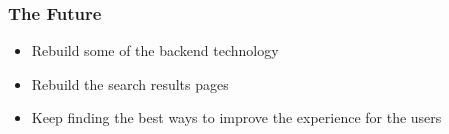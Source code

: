 \documentclass{beamer}
\begin{document}
\begin{frame}
  \frametitle{The Future}
  \begin{itemize}
    \pause \item Rebuild some of the backend technology
    \pause \item Rebuild the search results pages
    \pause \item Keep finding the best ways to improve the experience for the users
  \end{itemize}
\end{frame}
\end{document}
